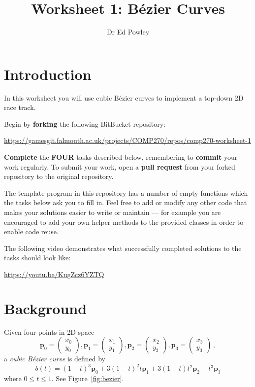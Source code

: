 \documentclass{../../../fal_assignment}
\title{Worksheet 1: B\'ezier Curves}
\author{Dr Ed Powley}
\newcommand{\colvec}[2]{\begin{pmatrix}#1\\#2\end{pmatrix}}
\newcommand{\colxy}[1]{\colvec{x_{#1}}{y_{#1}}}
\begin{document}
\maketitle

\section*{Introduction}

In this worksheet you will use cubic B\'ezier curves to implement a top-down 2D race track.

Begin by \textbf{forking} the following BitBucket repository:

\begin{center}
	\url{https://gamesgit.falmouth.ac.uk/projects/COMP270/repos/comp270-worksheet-1}
\end{center}

\textbf{Complete} the \textbf{FOUR} tasks described below, remembering to \textbf{commit} your work regularly.
To submit your work, open a \textbf{pull request} from your forked repository to the original repository.

The template program in this repository has a number of empty functions which the tasks below ask you to fill in. Feel free to add or modify any other code that makes your solutions easier to write or maintain ---
for example you are encouraged to add your own helper methods to the provided classes in order to enable code reuse.

The following video demonstrates what successfully completed solutions to the tasks should look like:

\begin{center}
	\url{https://youtu.be/KugZcz6YZTQ}
\end{center}

\section*{Background}

Given four points in 2D space
$$ \mathbf{p}_0 = \colxy0, \mathbf{p}_1 = \colxy1, \mathbf{p}_2 = \colxy2, \mathbf{p}_3 = \colxy3 \,, $$
a \emph{cubic B\'ezier curve} is defined by
$$ b(t) = (1-t)^3 \mathbf{p}_0 + 3(1-t)^2t \mathbf{p}_1 + 3(1-t)t^2 \mathbf{p}_2 + t^3 \mathbf{p}_3 $$
where $0 \leq t \leq 1$. See Figure~\ref{fig:bezier}.
\end{document}
